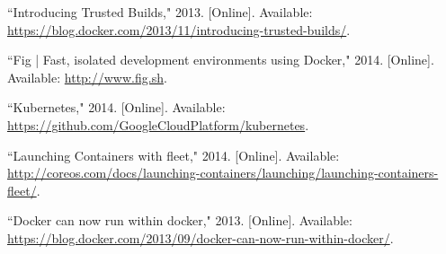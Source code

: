 \begin{thebibliography}{99}
\begin{singlespace}
``Introducing Trusted Builds," 2013. [Online]. Available: \url{https://blog.docker.com/2013/11/introducing-trusted-builds/}.

``Fig | Fast, isolated development environments using Docker," 2014. [Online]. Available: \url{http://www.fig.sh}.

``Kubernetes," 2014. [Online]. Available: \url{https://github.com/GoogleCloudPlatform/kubernetes}.

``Launching Containers with fleet," 2014. [Online]. Available: \url{http://coreos.com/docs/launching-containers/launching/launching-containers-fleet/}.

``Docker can now run within docker," 2013. [Online]. Available: \url{https://blog.docker.com/2013/09/docker-can-now-run-within-docker/}.

\end{singlespace}
\end{thebibliography}
